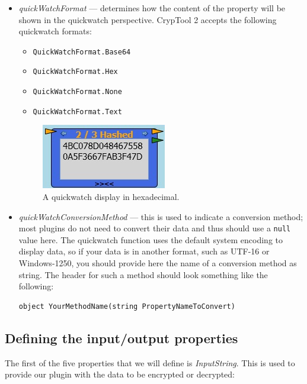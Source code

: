 \begin{itemize}
	\item \textit{quickWatchFormat} --- determines how the content of the property will be shown in the quickwatch perspective. CrypTool 2 accepts the following quickwatch formats:
	
	\begin{itemize}
		\item \texttt{QuickWatchFormat.Base64}
		\item \texttt{QuickWatchFormat.Hex}
		\item \texttt{QuickWatchFormat.None}
		\item \texttt{QuickWatchFormat.Text}
	\end{itemize}

\begin{figure}[h]
	\centering
		\includegraphics{figures/quick_watch.jpg}
	\caption{A quickwatch display in hexadecimal.}
	\label{fig:quick_watch}
\end{figure}
	
	\item \textit{quickWatchConversionMethod} --- this is used to indicate a conversion method; most plugins do not need to convert their data and thus should use a \texttt{null} value here. The quickwatch function uses the default system encoding to display data, so if your data is in another format, such as UTF-16 or Windows-1250, you should provide here the name of a conversion method as string. The header for such a method should look something like the following:

\begin{lstlisting}
object YourMethodName(string PropertyNameToConvert)
\end{lstlisting}

\end{itemize}

\subsection{Defining the input/output properties}
\label{sec:DefiningTheInputOutputProperties}

The first of the five properties that we will define is \textit{InputString}. This is used to provide our plugin with the data to be encrypted or decrypted:

